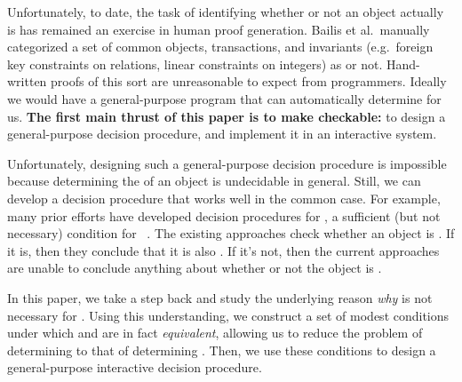 Unfortunately, to date, the task of identifying whether or not an object
actually is \invariantconfluent{} has remained an exercise in human proof
generation. Bailis et al.\ manually categorized a set of common objects,
transactions, and invariants (e.g.\ foreign key constraints on relations,
linear constraints on integers) as \invariantconfluent{} or not. Hand-written
proofs of this sort are unreasonable to expect from programmers. Ideally we
would have a general-purpose program that can automatically determine
\invariantconfluence{} for us.  \textbf{The first main thrust of this paper is
to make \invariantconfluence{} checkable:} to design a general-purpose
\invariantconfluence{} decision procedure, and implement it in an interactive
system.

Unfortunately, designing such a general-purpose decision procedure is
impossible because determining the \invariantconfluence{} of an object is
undecidable in general. Still, we can develop a decision procedure that works
well in the common case.
%
For example, many prior efforts have developed decision procedures for
\emph{\invariantclosure{}}, a sufficient (but not necessary) condition for
\invariantconfluence{}~\cite{li2012making, li2014automating}. The existing
approaches check whether an object is \invariantclosed{}. If it is, then they
conclude that it is also \invariantconfluent{}. If it's not, then the current
approaches are unable to conclude anything about whether or not the object is
\invariantconfluent{}.

In this paper, we take a step back and study the underlying reason \emph{why}
\invariantclosure{} is not necessary for \invariantconfluence{}.
%
%
Using this understanding, we construct a set of modest conditions under which
\invariantclosure{} and \invariantconfluence{} are in fact \emph{equivalent},
allowing us to reduce the problem of determining \invariantconfluence{} to that
of determining \invariantclosure{}.
%
Then, we use these conditions to design a general-purpose interactive
\invariantconfluence{} decision procedure.


